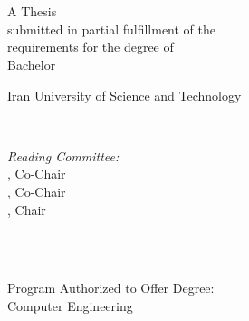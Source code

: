 
\begin{titlepage}
\begin{center}
\vspace*{\fill}
\singlespace
\thispagestyle{empty}
{\LARGE { \thesisTitle \\} %
\doublespacing
\vspace*{\baselineskip}
{\large \authorName }\\ %
\vspace*{1.5\baselineskip}
\large A Thesis
\\ submitted in partial fulfillment of the\\
requirements for the degree of\\
‌Bachelor\\
\vspace{1.5\baselineskip}

Iran University of Science and Technology
\\ \graduationYear}\\ %
\vspace{1.5\baselineskip}

\large \textit{Reading Committee:} \\

\ifdefined\secondAdvisor 
    \advisor, Co-Chair \\
    \secondAdvisor, Co-Chair \\
\else
    \advisor, Chair
\fi

\readingCommitteeOne \\

\ifdefined\readingCommitteeTwo
    \readingCommitteeTwo \\
\fi
    

\vspace{2\baselineskip}
  Program Authorized to Offer Degree: \\
Computer Engineering
  

  
  
  \vspace*{\fill}
  \clearpage
  \thispagestyle{empty}
\end{center}
\end{titlepage}

